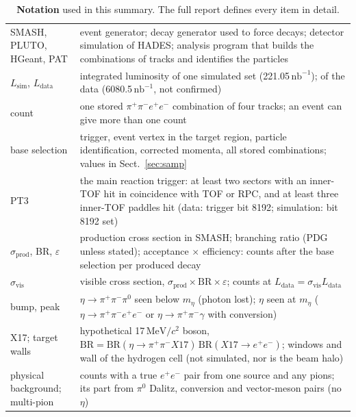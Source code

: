 \documentclass[11pt,a4paper]{article}
\renewcommand{\arraystretch}{1.15}
\newcommand{\pip}{\ensuremath{\pi^{+}}\xspace}
\newcommand{\pim}{\ensuremath{\pi^{-}}\xspace}
\newcommand{\piz}{\ensuremath{\pi^{0}}\xspace}
\newcommand{\ee}{\ensuremath{e^{+}e^{-}}\xspace}
\newcommand{\pipi}{\ensuremath{\pi^{+}\pi^{-}}\xspace}
\newcommand{\ppee}{\ensuremath{\pi^{+}\pi^{-}e^{+}e^{-}}\xspace}
\newcommand{\nbinv}{\ensuremath{\mathrm{nb}^{-1}}\xspace}
\newcommand{\MeVcc}{\ensuremath{\mathrm{MeV}/c^{2}}\xspace}
\newcommand{\Lsim}{\ensuremath{L_{\mathrm{sim}}}\xspace}
\newcommand{\Ldata}{\ensuremath{L_{\mathrm{data}}}\xspace}
\begin{document}
\par\vspace{0pt plus 10\baselineskip}\vspace{0pt plus -10\baselineskip}%
{\footnotesize
\setlength{\tabcolsep}{4pt}
\renewcommand{\arraystretch}{1.08}
\begin{longtable}{@{}>{\raggedright\arraybackslash}p{3.3cm} >{\raggedright\arraybackslash}p{\dimexpr\textwidth-3.3cm-2\tabcolsep\relax}@{}}
\caption{\textbf{Notation} used in this summary. The full report defines every item in detail.}
\label{tab:nota}\\
\toprule
SMASH, PLUTO, HGeant, PAT & event generator; decay generator used to force decays; detector simulation of HADES; analysis program that builds the combinations of tracks and identifies the particles \\
\Lsim, \Ldata & integrated luminosity of one simulated set (221.05\,\nbinv); of the data (6080.5\,\nbinv, not confirmed) \\
count & one stored \pip\pim$e^+e^-$ combination of four tracks; an event can give more than one count \\
base selection & trigger, event vertex in the target region, particle identification, corrected momenta, all stored combinations; values in Sect.~\ref{sec:samp} \\
PT3 & the main reaction trigger: at least two sectors with an inner-TOF hit in coincidence with TOF or RPC, and at least three inner-TOF paddles hit (data: trigger bit 8192; simulation: bit 8192 set) \\
$\sigma_{\mathrm{prod}}$, BR, $\varepsilon$ & production cross section in SMASH; branching ratio (PDG unless stated); acceptance $\times$ efficiency: counts after the base selection per produced decay \\
$\sigma_{\mathrm{vis}}$ & visible cross section, $\sigma_{\mathrm{prod}}\times\mathrm{BR}\times\varepsilon$; counts at \Ldata $=\sigma_{\mathrm{vis}}\Ldata$ \\
bump, peak & $\eta\to\pipi\piz$ seen below $m_\eta$ (photon lost); $\eta$ seen at $m_\eta$ ($\eta\to\ppee$ or $\eta\to\pipi\gamma$ with conversion) \\
X17; target walls & hypothetical 17\,\MeVcc boson, $\mathrm{BR} = \mathrm{BR}(\eta\to\pipi X17)\,\mathrm{BR}(X17\to\ee)$; windows and wall of the hydrogen cell (not simulated, nor is the beam halo) \\
physical background; multi-pion & counts with a true \ee pair from one source and any pions; its part from \piz Dalitz, conversion and vector-meson pairs (no $\eta$) \\

\end{longtable}}
\end{document}
